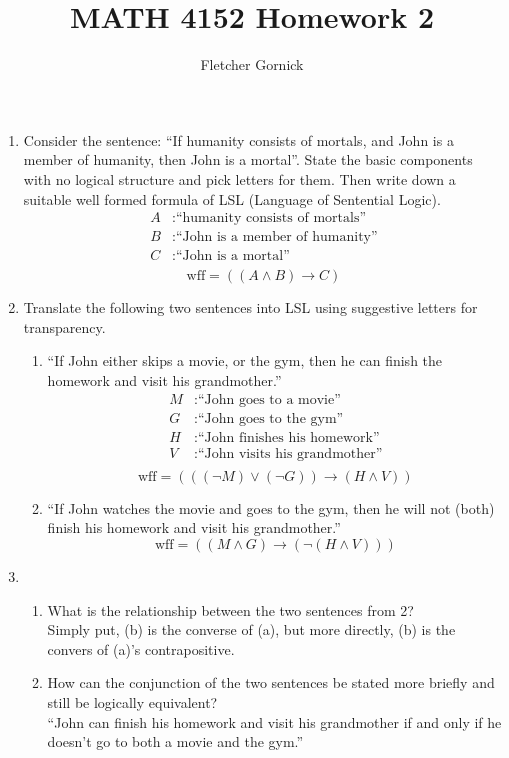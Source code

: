 \documentclass[11pt]{article}
\begin{document}
\title{\vspace{-1.5cm}MATH 4152 Homework 2}
  \author{Fletcher Gornick}
  \maketitle
  \begin{enumerate}
    \item Consider the sentence: ``If humanity consists of mortals, and John is a member of humanity, then John is a mortal''.  State the basic components with no logical structure and pick letters for them.  Then write down a suitable well formed formula of LSL (Language of Sentential Logic).
      \begin{align*}
        A &: \text{``humanity consists of mortals''} \\
        B &: \text{``John is a member of humanity''} \\
        C &: \text{``John is a mortal''} \\
      \end{align*}
      \[\text{wff} = ((A \wedge B) \to C)\]

    \item Translate the following two sentences into LSL using suggestive letters for transparency.
      \begin{enumerate}[label=(\alph*)]
        \item ``If John either skips a movie, or the gym, then he can finish the homework and visit his grandmother.''
      \begin{align*}
        M &: \text{``John goes to a movie''} \\
        G &: \text{``John goes to the gym''} \\
        H &: \text{``John finishes his homework''} \\
        V &: \text{``John visits his grandmother''} \\
      \end{align*}
      \[\text{wff} = (((\neg M) \vee (\neg G)) \to (H \wedge V))\]

        \item ``If John watches the movie and goes to the gym, then he will not (both) finish his homework and visit his grandmother.''
      \[\text{wff} = ((M \wedge G) \to (\neg (H \wedge V)))\]
      \end{enumerate}

    \item \begin{enumerate}[label=(\alph*)]
        \item What is the relationship between the two sentences from 2? \\
          Simply put, (b) is the converse of (a), but more directly, (b) is the convers of (a)'s contrapositive.
        \item How can the conjunction of the two sentences be stated more briefly and still be logically equivalent? \\
          ``John can finish his homework and visit his grandmother if and only if he doesn't go to both a movie and the gym.''
      \end{enumerate}
      \newpage


\end{enumerate}
\end{document}
